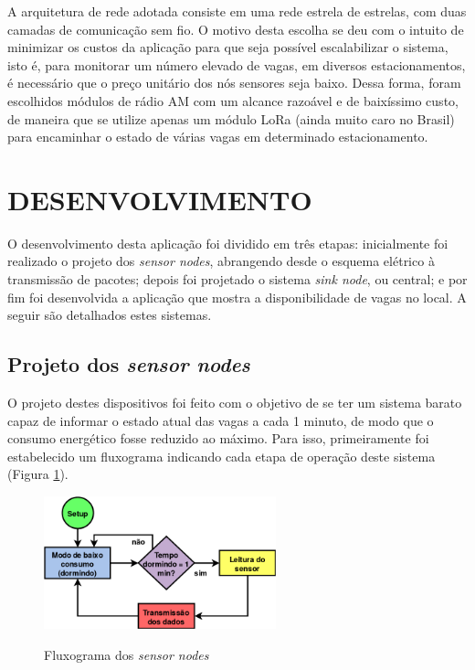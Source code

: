 \documentclass[oneside,openright,12pt]{ufsm_2015} %
\begin{document}
    A arquitetura de rede adotada consiste em uma rede estrela de estrelas, com duas camadas de comunicação sem fio. O motivo desta escolha se deu com o intuito de minimizar os custos da aplicação para que seja possível escalabilizar o sistema, isto é, para monitorar um número elevado de vagas, em diversos estacionamentos, é necessário que o preço unitário dos nós sensores seja baixo. Dessa forma, foram escolhidos módulos de rádio AM com um alcance razoável e de baixíssimo custo, de maneira que se utilize apenas um módulo LoRa (ainda muito caro no Brasil) para encaminhar o estado de várias vagas em determinado estacionamento. 
    
    
    
    \section{DESENVOLVIMENTO}
    O desenvolvimento desta aplicação foi dividido em três etapas: inicialmente foi realizado o projeto dos \textit{sensor nodes}, abrangendo desde o esquema elétrico à transmissão de pacotes; depois foi projetado o sistema \textit{sink node}, ou central; e por fim foi desenvolvida a aplicação que mostra a disponibilidade de vagas no local. A seguir são detalhados estes sistemas.
    
    \subsection{Projeto dos \textit{sensor nodes}}
    O projeto destes dispositivos foi feito com o objetivo de se ter um sistema barato capaz de informar o estado atual das vagas a cada 1 minuto, de modo que o consumo energético fosse reduzido ao máximo. Para isso, primeiramente foi estabelecido um fluxograma indicando cada etapa de operação deste sistema (Figura \ref{fig:flux-sensor-node}).
    
    \begin{figure}[ht]
     	    \caption{\label{exepretex} Fluxograma dos \textit{sensor nodes}}
            \centering
            \includegraphics[width=0.6\textwidth]{figuras/funcionamento-sensor-node.png}
            \vspace{\baselineskip} %
                \label{fig:flux-sensor-node}
    \end{figure}
    
\end{document}
